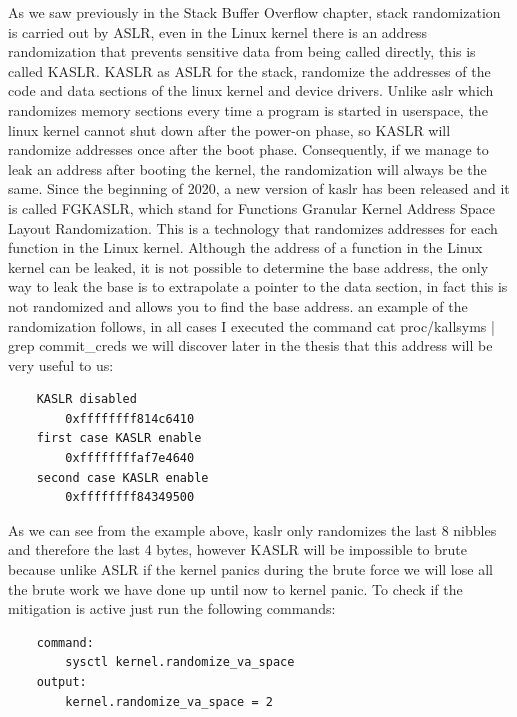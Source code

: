 \documentclass{report}
\begin{document}
    As we saw previously in the Stack Buffer Overflow chapter, stack randomization is carried out by ASLR, even in the Linux kernel there is an address randomization that prevents sensitive data from being called directly, this is called KASLR. \newline
    KASLR as ASLR for the stack, randomize the addresses  of the code and data sections of the linux kernel and device drivers.\newline
    Unlike aslr which randomizes memory sections every time a program is started in userspace, the linux kernel cannot shut down after the power-on phase, so KASLR will randomize addresses once after the boot phase.\newline
    Consequently, if we manage to leak an address after booting the kernel, the randomization will always be the same.\newline
    Since the beginning of 2020, a new version of kaslr has been released and it is called FGKASLR, which stand for Functions Granular Kernel Address Space Layout Randomization.\newline 
    This is a technology that randomizes addresses for each function in the Linux kernel.\newline 
    Although the address of a function in the Linux kernel can be leaked, it is not possible to determine the base address, the only way to leak the base is to extrapolate a pointer to the data section, in fact this is not randomized and allows you to find the base address.\newline
    an example of the randomization follows, in all cases I executed the command cat proc/kallsyms | grep commit\_creds we will discover later in the thesis that this address will be very useful to us:\newline
    \begin{verbatim}
    KASLR disabled 
        0xffffffff814c6410
    first case KASLR enable  
        0xffffffffaf7e4640
    second case KASLR enable
        0xffffffff84349500
    \end{verbatim}
    As we can see from the example above, kaslr only randomizes the last 8 nibbles and therefore the last 4 bytes, however KASLR will be impossible to brute because unlike ASLR if the kernel panics during the brute force we will lose all the brute work we have done up until now to kernel panic.\newline
    To check if the mitigation is active just run the following commands: \newline
    \begin{verbatim}
    command:
        sysctl kernel.randomize_va_space                  
    output:
        kernel.randomize_va_space = 2

    \end{verbatim}
    \clearpage
\end{document}
